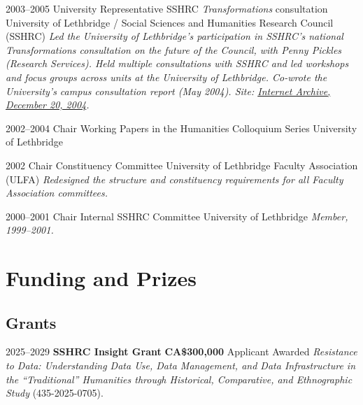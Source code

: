 \documentclass[11pt,letterpaper,sans]{moderncv}
\begin{document}
{\cventry
  {2003--2005}
  {University Representative}
  {SSHRC \textit{Transformations} consultation}
  {University of Lethbridge / Social Sciences and Humanities Research Council (SSHRC)}
  {}
  {\textit{Led the University of Lethbridge’s participation in SSHRC's national Transformations consultation on the future of the Council, with Penny Pickles (Research Services). Held multiple consultations with SSHRC and led workshops and focus groups across units at the University of Lethbridge. Co-wrote the University’s campus consultation report (May 2004). Site: \href{http://web.archive.org/web/20041220081230/http://www.uleth.ca:80/transformations/}{Internet Archive, December 20, 2004}.}}

\cventry
  {2002--2004}
  {Chair}
  {Working Papers in the Humanities Colloquium Series}
  {University of Lethbridge}
  {}
  {}

\cventry
  {2002}
  {Chair}
  {Constituency Committee}
  {University of Lethbridge Faculty Association (ULFA)}
  {}
  {\textit{Redesigned the structure and constituency requirements for all Faculty Association committees.}}

\cventry
  {2000--2001}
  {Chair}
  {Internal SSHRC Committee}
  {University of Lethbridge}
  {}
  {\textit{Member, 1999--2001.}}
\endgroup

\section{\textbf{Funding and Prizes}}

\subsection*{\textbf{Grants}}

\vspace{1em}

\cventry
  {2025--2029}
  {\textbf{SSHRC Insight Grant}}
  {\textbf{CA\$300{,}000}}
  {Applicant}
  {Awarded}
  {\emph{Resistance to Data: Understanding Data Use, Data Management, and Data Infrastructure in the “Traditional” Humanities through Historical, Comparative, and Ethnographic Study} (435-2025-0705).}

}
\end{document}
